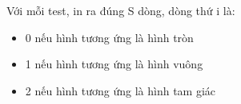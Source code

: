 Với mỗi test, in ra đúng S dòng, dòng thứ i là:
\begin{itemize}
	\item 0 nếu hình tương ứng là hình tròn
	\item 1 nếu hình tương ứng là hình vuông
	\item 2 nếu hình tương ứng là hình tam giác
\end{itemize}